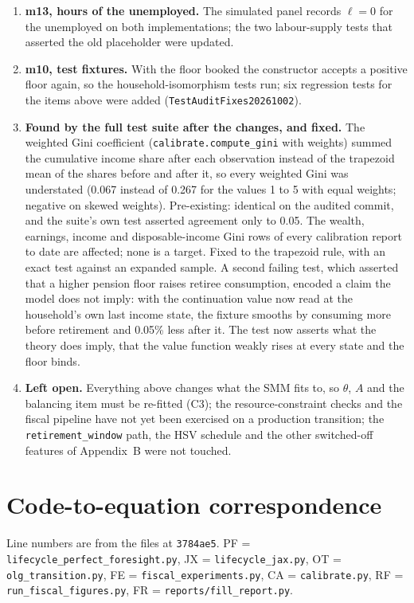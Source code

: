 \documentclass[11pt,a4paper]{article}
\newcommand{\code}[1]{\texttt{#1}}
\begin{document}
\begin{enumerate}[label=p\arabic*.]
\item \textbf{m13, hours of the unemployed.} The simulated panel records $\ell = 0$ for the unemployed on both implementations; the two labour-supply tests that asserted the old placeholder were updated.
\item \textbf{m10, test fixtures.} With the floor booked the constructor accepts a positive floor again, so the household-isomorphism tests run; six regression tests for the items above were added (\code{TestAuditFixes20261002}).
\item \textbf{Found by the full test suite after the changes, and fixed.} The weighted Gini coefficient (\code{calibrate.compute_gini} with weights) summed the cumulative income share after each observation instead of the trapezoid mean of the shares before and after it, so every weighted Gini was understated (0.067 instead of 0.267 for the values 1 to 5 with equal weights; negative on skewed weights). Pre-existing: identical on the audited commit, and the suite's own test asserted agreement only to 0.05. The wealth, earnings, income and disposable-income Gini rows of every calibration report to date are affected; none is a target. Fixed to the trapezoid rule, with an exact test against an expanded sample. A second failing test, which asserted that a higher pension floor raises retiree consumption, encoded a claim the model does not imply: with the continuation value now read at the household's own last income state, the fixture smooths by consuming more before retirement and 0.05\% less after it. The test now asserts what the theory does imply, that the value function weakly rises at every state and the floor binds.
\item \textbf{Left open.} Everything above changes what the SMM fits to, so $\theta$, $A$ and the balancing item must be re-fitted (C3); the resource-constraint checks and the fiscal pipeline have not yet been exercised on a production transition; the \code{retirement_window} path, the HSV schedule and the other switched-off features of Appendix~B were not touched.
\end{enumerate}

\appendix
\section{Code-to-equation correspondence}

Line numbers are from the files at \code{3784ae5}. PF = \code{lifecycle_perfect_foresight.py}, JX = \code{lifecycle_jax.py}, OT = \code{olg_transition.py}, FE = \code{fiscal_experiments.py}, CA = \code{calibrate.py}, RF = \code{run_fiscal_figures.py}, FR = \code{reports/fill_report.py}.
\end{document}
